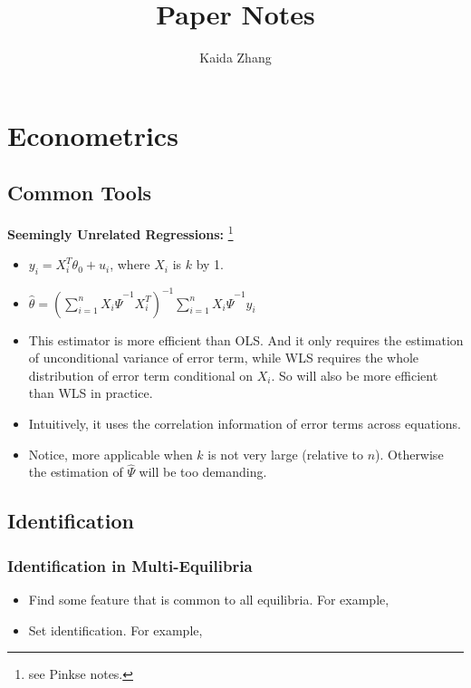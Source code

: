 \documentclass{book}
\title{Paper Notes}
\author{Kaida Zhang}
\date{}
\theoremstyle{plain}
\theoremstyle{definition}
\begin{document}

\tableofcontents{}
\label{toc}
\setcounter{tocdepth}{1}			%


\part{Econometrics}
\label{part:econometrics}


\chapter{Common Tools} %
\label{cha:common_tools}


\noindent
\textbf{Seemingly Unrelated Regressions:}
\footnote{see Pinkse notes.}
\begin{itemize}
	\item $y_i=X_i^T\theta_0+u_i$, where $X_i$ is $k$ by 1.
	\item $\hat \theta=(\sum_{i=1}^n{X_i\hat\Psi^{-1} X_i^T})^{-1}
	\sum_{i=1}^n{X_i\hat\Psi^{-1} y_i}$
	\item This estimator is more efficient than OLS. And it only requires the estimation of unconditional variance of error term, while WLS requires the whole distribution of error term conditional on $X_i$. So will also be more efficient than WLS in practice. 
	\item Intuitively, it uses the correlation information of error terms across equations.
	\item Notice, more applicable when $k$ is not very large (relative to $n$). Otherwise the estimation of $\hat \Psi$ will be too demanding.
\end{itemize}

\chapter{Identification} %
\label{cha:identification}


\section{Identification in Multi-Equilibria} %
\label{sec:identification_in_multi_equilibria}

\begin{itemize}
	\item Find some feature that is common to all equilibria. For example, \cite{Berry:1992gl}

	\item Set identification. For example, \cite{Shum:2018hw}
\end{itemize}
\end{document}
